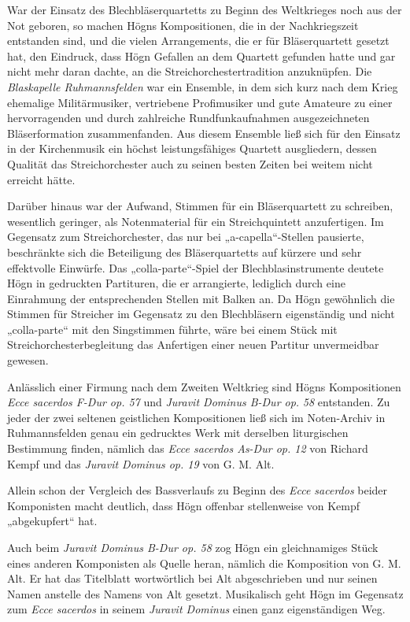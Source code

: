 \documentclass{book}
\begin{document}
War der Einsatz des Blechbläserquartetts zu Beginn des Weltkrieges noch
aus der Not geboren, so machen Högns Kompositionen, die in der
Nach\-kriegszeit entstanden sind, und die vielen Arrangements, die er
für Bläser\-quartett gesetzt hat, den Eindruck, dass Högn Gefallen an
dem Quartett ge\-funden hatte und gar nicht mehr daran dachte, an die
Streichorchester\-tradition anzuknüpfen. Die \textit{Blaskapelle
Ruhmannsfelden} war ein Ensemble, in dem sich kurz nach dem Krieg
ehemalige Militärmusiker, vertriebene Profi\-musiker und gute Amateure
zu einer hervorragenden und durch zahlreiche Rundfunkaufnahmen
ausgezeichneten Bläserformation zusammenfanden. Aus diesem Ensemble
ließ sich für den Einsatz in der Kirchenmusik ein höchst
leistungsfähiges Quartett ausgliedern, dessen Qualität das
Streichorchester auch zu seinen besten Zeiten bei weitem nicht erreicht
hätte.

Darüber hinaus war der Aufwand, Stimmen für ein Bläserquartett zu
schreiben, wesentlich geringer, als Notenmaterial für ein
Streichquintett anzu\-fertigen. Im Gegensatz zum Streichorchester, das
nur bei „a-capella“-Stellen pausierte, beschränkte sich die Beteiligung
des Bläserquartetts auf kürzere und sehr effektvolle Einwürfe. Das
„colla-parte“-Spiel der Blechblasinstrumente deutete Högn in gedruckten
Partituren, die er arrangierte, lediglich durch eine Einrahmung der
entsprechenden Stellen mit Balken an. Da Högn gewöhnlich die Stimmen
für Streicher im Gegensatz zu den Blechbläsern eigenständig und nicht
„colla-parte“ mit den Singstimmen führte, wäre bei einem Stück mit
Streichorchesterbegleitung das Anfertigen einer neuen Partitur
unvermeidbar gewesen.

Anlässlich einer Firmung nach dem Zweiten Weltkrieg sind Högns
Kom\-positionen \textit{Ecce sacerdos F-Dur op. 57} und \textit{Juravit
Dominus B-Dur op.} \textit{58} ent\-standen. Zu jeder der zwei seltenen
geistlichen Kompositionen ließ sich im Noten-Archiv in Ruhmannsfelden
genau ein gedrucktes Werk mit derselben liturgischen Bestimmung finden,
nämlich das \textit{Ecce sacerdos As-Dur op. 12} von Richard Kempf und
das \textit{Juravit Dominus op. 19} von G. M. Alt.

Allein schon der Vergleich des Bassverlaufs zu Beginn des \textit{Ecce
sacerdos} bei\-der Komponisten macht deutlich, dass Högn offenbar
stellenweise von Kempf „abgekupfert“ hat. 

Auch beim \textit{Juravit Dominus B-Dur op. 58} zog Högn ein
gleichnamiges Stück eines anderen Komponisten als Quelle heran, nämlich
die Komposition von G. M. Alt. Er hat das Titelblatt wortwörtlich bei
Alt abgeschrieben und nur seinen Namen anstelle des Namens von Alt
gesetzt. Musikalisch geht Högn im Gegensatz zum \textit{Ecce sacerdos}
in seinem \textit{Juravit Dominus} einen ganz eigen\-ständigen Weg.
\end{document}
